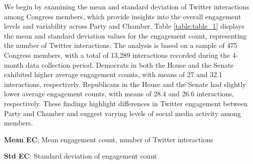 \documentclass[11pt]{article}
\begin{document}
We begin by examining the mean and standard deviation of Twitter interactions among Congress members, which provide insights into the overall engagement levels and variability across Party and Chamber. Table \ref{table:table_1} displays the mean and standard deviation values for the engagement count, representing the number of Twitter interactions. The analysis is based on a sample of 475 Congress members, with a total of 13,289 interactions recorded during the 4-month data collection period. Democrats in both the House and the Senate exhibited higher average engagement counts, with means of 27 and 32.1 interactions, respectively. Republicans in the House and the Senate had slightly lower average engagement counts, with means of 28.4 and 26.6 interactions, respectively. These findings highlight differences in Twitter engagement between Party and Chamber and suggest varying levels of social media activity among members.

\begin{table}[h]
\caption{Mean and standard deviation of Twitter interactions of Congress members by Party and Chamber}
\label{table:table_1}
\begin{threeparttable}
\renewcommand{\TPTminimum}{\linewidth}
\begin{tablenotes}
\footnotesize
\item \textbf{Mean EC}: Mean engagement count, number of Twitter interactions
\item \textbf{Std EC}: Standard deviation of engagement count
\end{tablenotes}
\end{threeparttable}
\end{table}
\end{document}
